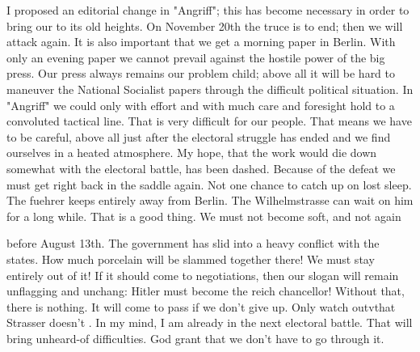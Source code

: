 
I proposed an editorial change in "Angriff"; this has become necessary in order to bring our  to its old heights. On November 20th the truce is to end; then we will attack again. It is also important that we get a morning paper in Berlin. With only an evening paper we cannot prevail against the hostile power of the big press. Our press always remains our problem child; above all it will be hard to maneuver the National Socialist papers through the difficult political situation. In "Angriff" we could only with effort and with much care and foresight hold to a convoluted tactical line. That is very difficult for our people. That means we have to be careful, above all just after the electoral struggle has ended and we find ourselves in a heated atmosphere. My hope, that the work would die down somewhat with the electoral battle, has been dashed. Because of the defeat we must get right back in the saddle again. Not one chance to catch up on lost sleep. The fuehrer keeps entirely away from Berlin. The Wilhelmstrasse can wait on him for a long while. That is a good thing. We must not become soft, and not  again 

 before August 13th. The government has slid into a heavy conflict with the states. How much porcelain will be slammed together there! We must stay entirely out of it! If it should come to negotiations, then our slogan will remain unflagging and unchang: Hitler must become the reich chancellor! Without that, there is nothing. It will come to pass if we don't give up. Only watch outvthat Strasser doesn't . In my mind, I am already in the next electoral battle. That will bring unheard-of difficulties. God grant that we don't have to go through it.%